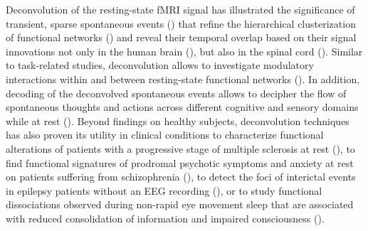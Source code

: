 Deconvolution of the resting-state fMRI signal has illustrated the significance of transient, sparse spontaneous events (\citealt{Petridou2012PeriodsrestfMRI,Allan2015FunctionalConnectivityMRI}) that refine the hierarchical clusterization of functional networks (\citealt{Karahanoglu2013TotalactivationfMRI}) and reveal their temporal overlap based on their signal innovations not only in the human brain (\citealt{Karahanoglu2015Transientbrainactivity}), but also in the spinal cord (\citealt{kinany2020DynamicFunctionalConnectivity}). Similar to task-related studies, deconvolution allows to investigate modulatory interactions within and between resting-state functional networks (\citealt{Di2013ModulatoryInteractionsResting,Di2015Characterizationsrestingstate}). In addition, decoding of the deconvolved spontaneous events allows to decipher the flow of spontaneous thoughts and actions across different cognitive and sensory domains while at rest (\citealt{Karahanoglu2015Transientbrainactivity,GonzalezCastillo2019Imagingspontaneousflow,Tan_2017}). Beyond findings on healthy subjects, deconvolution techniques has also proven its utility in clinical conditions to characterize functional alterations of patients with a progressive stage of multiple sclerosis at rest (\citealt{Bommarito2020Alteredanteriordefault}), to find functional signatures of prodromal psychotic symptoms and anxiety at rest on patients suffering from schizophrenia (\citealt{Zoeller2019Largescalebrain}), to detect the foci of interictal events in epilepsy patients without an EEG recording (\citealt{Lopes2012Detectionepilepticactivity,Karahanoglu2013Spatialmappinginterictal}), or to study functional dissociations observed during non-rapid eye movement sleep that are associated with reduced consolidation of information and impaired consciousness (\citealt{Tarun2020NREMsleepstages}).

